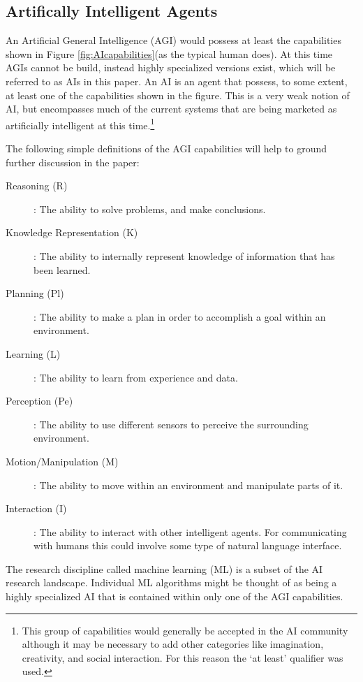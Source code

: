\subsection{Artifically Intelligent Agents}
    An Artificial General Intelligence (AGI) would possess at least the capabilities shown in Figure \ref{fig:AIcapabilities}(as the typical human does). At this time AGIs cannot be build, instead highly specialized versions exist, which will be referred to as AIs in this paper. An AI is an agent that possess, to some extent, at least one of the capabilities shown in the figure. This is a very weak notion of AI, but encompasses much of the current systems that are being marketed as artificially intelligent at this time.\footnote{This group of capabilities would generally be accepted in the AI community although it may be necessary to add other categories like imagination, creativity, and social interaction. For this reason the `at least' qualifier was used.}

    The following simple definitions of the AGI capabilities will help to ground further discussion in the paper:

    \begin{description}
        \item [Reasoning (R)]: The ability to solve problems, and make conclusions.
        \item [Knowledge Representation (K)]: The ability to internally represent knowledge of information that has been learned.
        \item [Planning (Pl)]: The ability to make a plan in order to accomplish a goal within an environment.
        \item [Learning (L)]: The ability to learn from experience and data.
        \item [Perception (Pe)]: The ability to use different sensors to perceive the surrounding environment.
        \item [Motion/Manipulation (M)]: The ability to move within an environment and manipulate parts of it.
        \item [Interaction (I)]: The ability to interact with other intelligent agents. For communicating with humans this could involve some type of natural language interface.
    \end{description}

    The research discipline called machine learning (ML) is a subset of the AI research landscape. Individual ML algorithms might be thought of as being a highly specialized AI that is contained within only one of the AGI capabilities.

